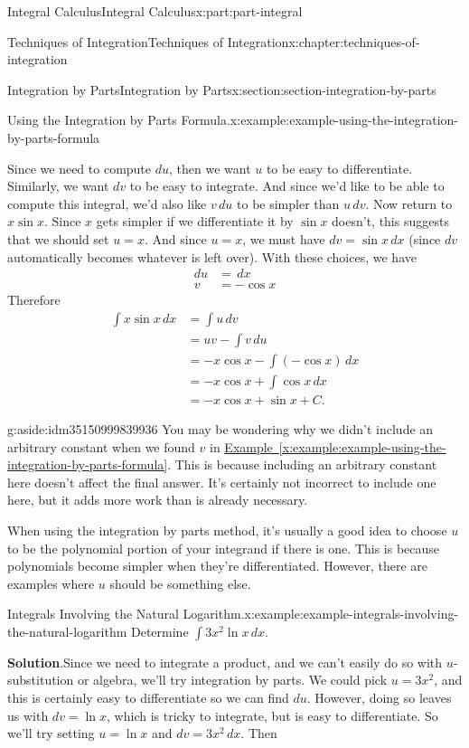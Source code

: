 \documentclass[twoside,10pt,]{tufte-book}
\newcommand{\blocktitlefont}{\relax}
\newcommand{\xreffont}{\relax}
\numberwithin{equation}{part}
\begin{document}
\begin{partptx}{Integral Calculus}{}{Integral Calculus}{}{}{x:part:part-integral}
\begin{chapterptx}{Techniques of Integration}{}{Techniques of Integration}{}{}{x:chapter:techniques-of-integration}
\begin{sectionptx}{Integration by Parts}{}{Integration by Parts}{}{}{x:section:section-integration-by-parts}
\begin{example}{Using the Integration by Parts Formula.}{x:example:example-using-the-integration-by-parts-formula}
\par
Since we need to compute \(du\), then we want \(u\) to be easy to differentiate. Similarly, we want \(dv\) to be easy to integrate. And since we'd like to be able to compute this integral, we'd also like \(v\,du\) to be simpler than \(u\,dv\). Now return to \(x\sin x\). Since \(x\) gets simpler if we differentiate it by \(\sin x\) doesn't, this suggests that we should set \(u = x\). And since \(u = x\), we must have \(dv = \sin x\,dx\) (since \(dv\) automatically becomes whatever is left over). With these choices, we have%
%
\begin{align*}
du & = \,dx \\
v & = -\cos x 
\end{align*}
Therefore%
%
\begin{align*}
\int x\sin x\,dx & = \int u\,dv \\
& = uv - \int v\,du \\
& = -x\cos x - \int (-\cos x)\,dx \\
& = -x\cos x + \int\cos x\,dx \\
& = -x\cos x + \sin x + C. 
\end{align*}
\end{example}
\begin{aside}{}{g:aside:idm35150999839936}%
You may be wondering why we didn't include an arbitrary constant when we found \(v\) in \hyperref[x:example:example-using-the-integration-by-parts-formula]{Example~{\xreffont\ref{x:example:example-using-the-integration-by-parts-formula}}}. This is because including an arbitrary constant here doesn't affect the final answer. It's certainly not incorrect to include one here, but it adds more work than is already necessary.%
\end{aside}
When using the integration by parts method, it's usually a good idea to choose \(u\) to be the polynomial portion of your integrand if there is one. This is because polynomials become simpler when they're differentiated. However, there are examples where \(u\) should be something else.%
\begin{example}{Integrals Involving the Natural Logarithm.}{x:example:example-integrals-involving-the-natural-logarithm}%
Determine \(\int 3x^{2}\ln x\,dx\).%
\par\smallskip%
\noindent\textbf{\blocktitlefont Solution}.\hypertarget{g:solution:idm35150999836224}{}\quad{}Since we need to integrate a product, and we can't easily do so with \(u\)-substitution or algebra, we'll try integration by parts. We could pick \(u = 3x^{2}\), and this is certainly easy to differentiate so we can find \(du\). However, doing so leaves us with \(dv = \ln x\), which is tricky to integrate, but is easy to differentiate. So we'll try setting \(u = \ln x\) and \(dv = 3x^{2}\,dx\). Then%

\end{example}
\end{sectionptx}
\end{chapterptx}
\end{partptx}
\end{document}
